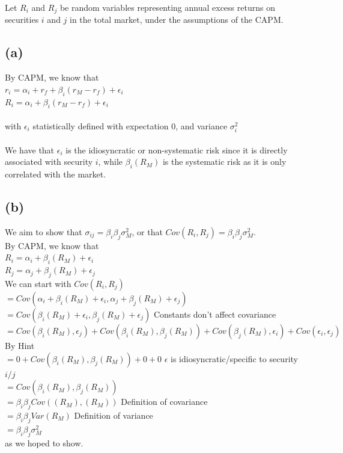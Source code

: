 \documentclass{article}
\begin{document}
{\Large

Let $R_i$ and $R_j$ be random variables representing annual excess returns on securities $i$ and $j$ in the total market, under the assumptions of the CAPM. \\

\subsection*{(a)}

By CAPM, we know that \\
$r_i = \alpha_i + r_f + \beta_i(r_M - r_f) + \epsilon_i$ \\ 
$R_i = \alpha_i + \beta_i (r_M - r_f) + \epsilon_i$ \\
 \\
with $\epsilon_i$ statistically defined with expectation 0, and variance $\sigma_i^2$ \\ \\
We have that $\epsilon_i$ is the idiosyncratic or non-systematic risk since it is directly associated with security $i$, while $\beta_i (R_M)$ is the systematic risk as it is only correlated with the market.

\subsection*{(b)}

We aim to show that $\sigma_{ij} = \beta_i \beta_j \sigma_M^2$, or that $Cov(R_i, R_j) = \beta_i \beta_j \sigma_M^2$. \\
By CAPM, we know that \\
$R_i = \alpha_i + \beta_i (R_M) + \epsilon_i$ \\
$R_j = \alpha_j + \beta_j (R_M) + \epsilon_j$ \\
We can start with $Cov(R_i, R_j)$ \\ 
$= Cov (\alpha_i + \beta_i (R_M) + \epsilon_i, \alpha_j + \beta_j (R_M) + \epsilon_j)$ \\
$= Cov(\beta_i (R_M) + \epsilon_i, \beta_j (R_M) + \epsilon_j)$ \hfill Constants don't affect covariance \\ 
$= Cov(\beta_i (R_M), \epsilon_j) + Cov(\beta_i (R_M), \beta_j (R_M)) + Cov(\beta_j (R_M), \epsilon_i) + Cov(\epsilon_i, \epsilon_j)$ By Hint \\
$= 0 + Cov(\beta_i (R_M), \beta_j (R_M)) + 0 + 0$ \hfill $\epsilon$ is idiosyncratic/specific to security $i/j$ \\ 
$= Cov(\beta_i (R_M), \beta_j (R_M))$ \\
$= \beta_i \beta_j Cov((R_M), (R_M))$ \hfill Definition of covariance \\
$= \beta_i \beta_j Var(R_M)$ \hfill Definition of variance \\
$= \beta_i \beta_j \sigma^2_M$ \\
as we hoped to show.



}
\end{document}
